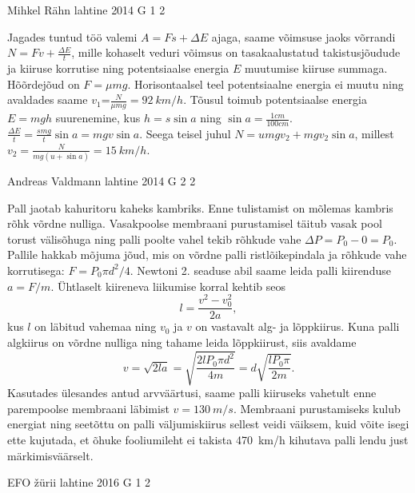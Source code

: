 \documentclass[11pt, twoside]{article}
\begin{document}
{%
{Mihkel Rähn} %
{lahtine} %
{2014} %
{G 1} %
{2} %
{

\ifSolution
Jagades tuntud töö valemi $A=Fs+\Delta E$ ajaga, saame võimsuse jaoks võrrandi $N=Fv+\frac{\Delta E}{t}$, mille kohaselt veduri võimsus on tasakaalustatud takistusjõudude ja kiiruse korrutise ning potentsiaalse energia $E$ muutumise kiiruse summaga. Hõõrdejõud on $F=\mu mg$. Horisontaalsel teel potentsiaalne energia ei muutu ning avaldades saame $v_1$=$\frac{N}{\mu mg}=\SI{92}{km \per h}$. Tõusul toimub potentsiaalse energia $E=mgh$ suurenemine, kus $h=s\sin a$ ning $\sin a=\frac{1cm}{100cm}$. $\frac{\Delta E}{t}=\frac{smg}{t}\sin a=mgv\sin a$.
Seega teisel juhul $N=umgv_2+mgv_2\sin a$, millest $v_2=\frac{N}{mg(u+\sin a)}=\SI{15}{km \per h}$.
\fi
}

{Andreas Valdmann} %
{lahtine} %
{2014} %
{G 2} %
{2} %
{

\ifSolution
Pall jaotab kahuritoru kaheks kambriks. Enne tulistamist on mõlemas kambris rõhk võrdne nulliga. Vasakpoolse membraani purustamisel täitub vasak pool torust välisõhuga ning palli poolte vahel tekib rõhkude vahe $\Delta P=P_0-0=P_0$. Pallile hakkab mõjuma jõud, mis on võrdne palli ristlõikepindala ja rõhkude vahe korrutisega: $F=P_0\pi d^2/4$. Newtoni 2. seaduse abil saame leida palli kiirenduse $a=F/m$. Ühtlaselt kiireneva liikumise korral kehtib seos
\[ l=\frac{v^2-v_0^2}{2a}, \]
kus $l$ on läbitud vahemaa ning $v_0$ ja $v$ on vastavalt alg- ja lõppkiirus. Kuna palli algkiirus on võrdne nulliga ning tahame leida lõppkiirust, siis avaldame
\[ v=\sqrt{2la}=\sqrt{\frac{2lP_0\pi d^2}{4m}}=d\sqrt{\frac{lP_0\pi}{2m}}.\]
Kasutades ülesandes antud arvväärtusi, saame palli kiiruseks vahetult enne parempoolse membraani läbimist $v=\SI{130}{m/s}$. Membraani purustamiseks kulub energiat ning seetõttu on palli väljumiskiirus sellest veidi väiksem, kuid võite isegi ette kujutada, et õhuke fooliumileht ei takista \SI{470}{km/h} kihutava palli lendu just märkimisväärselt.
\fi
}

{EFO žürii} %
{lahtine} %
{2016} %
{G 1} %
{2} %
{

}}
\end{document}

